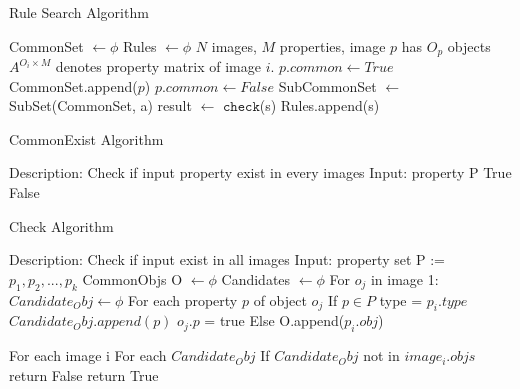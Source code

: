 \begin{algorithm}
	\caption{Rule Search Algorithm} 
	\begin{algorithmic}[1]
		\State CommonSet $ \leftarrow \phi $ 
		\State Rules $ \leftarrow \phi $ 
		\State $ N $ images, $ M $ properties, image $ p $ has $ O_p $ objects 
		\State $ A^{O_i \times M} $ denotes property matrix of image $ i $.
				\State $ p.common \leftarrow True $
				\State CommonSet.append($ p $)
			\Else 
				\State $ p.common\leftarrow False $
			\EndIf
		\EndFor 
			\Statex SubCommonSet $ \leftarrow $ SubSet(CommonSet, a)
				\State result $\leftarrow$ $\texttt{check}$(s)
					\State Rules.append(s)
				\EndIf
			\EndFor
		\EndFor
	\end{algorithmic} 
\end{algorithm}


\begin{algorithm}
	\caption{CommonExist Algorithm} 
	\begin{algorithmic}[1]
		\State Description: Check if input property exist in every images
		\State Input: property P
				\State \Return True
			\Else 
				\State \Return False
			\EndIf
		\EndFor
	\end{algorithmic} 
\end{algorithm}


\begin{algorithm}
	\caption{Check Algorithm} 
	\begin{algorithmic}[1]
		\State Description: Check if input exist in all images
		\State Input: property set P := {$ p_1, p_2,..., p_k $}
		\State CommonObjs O $ \leftarrow \phi $
		\State Candidates $ \leftarrow \phi $ 
		For $ o_j $ in image 1:
			$ Candidate_Obj \leftarrow \phi $ 
			For each property $ p $  of object $ o_j $
				If $ p \in P $
					type = $ p_i.type $
					$ Candidate_Obj.append(p) $
					$ o_j.p $ = true
				Else
					O.append($p_i.obj $)
		
		For each image i
			For each $ Candidate_Obj $
				If $ Candidate_Obj $ not in $ image_i.objs $
					return False
		return True
	\end{algorithmic} 
\end{algorithm}
